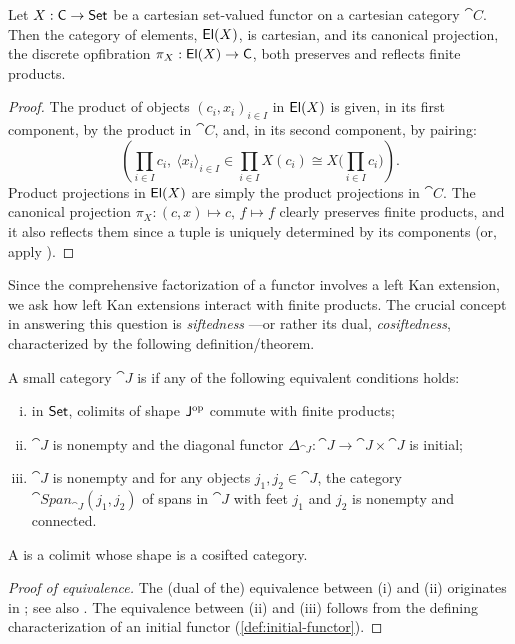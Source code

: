 \documentclass[11pt]{article}
\numberwithin{equation}{section}
\begin{document}
\begin{lemma}
  \label{lem:cartesian-elements-construction}
  Let $X: \mathsf{C} \to \mathsf{Set}$ be a cartesian set-valued functor on a cartesian
  category $\cat{C}$. Then the category of elements, $\mathop{\mathsf{El}}(X)$, is cartesian, and
  its canonical projection, the discrete opfibration ${\pi_X: \mathop{\mathsf{El}}(X) \to \mathsf{C}}$,
  both preserves and reflects finite products.
\end{lemma}
\begin{proof}
  The product of objects $(c_i, x_i)_{i \in I}$ in $\mathop{\mathsf{El}}(X)$ is given, in its
  first component, by the product in $\cat{C}$, and, in its second component, by
  pairing:
  \begin{equation*}
    \left(
      \prod_{i \in I} c_i,\
      \langle x_i \rangle_{i \in I} \in \prod_{i \in I} X(c_i)
        \cong X\big({\textstyle\prod_{i \in I} c_i}\big)
    \right).
  \end{equation*}
  Product projections in $\mathop{\mathsf{El}}(X)$ are simply the product projections in
  $\cat{C}$. The canonical projection $\pi_X: {(c, x) \mapsto c},\, {f \mapsto f}$ clearly
  preserves finite products, and it also reflects them since a tuple is uniquely
  determined by its components (or, apply \cite[\mbox{Lemma
    6.8}]{patterson2023}).
\end{proof}

Since the comprehensive factorization of a functor involves a left Kan
extension, we ask how left Kan extensions interact with finite products. The
crucial concept in answering this question is \emph{siftedness}
\cite{gabriel1971}---or rather its dual, \emph{cosiftedness}, characterized by
the following definition/theorem.

\begin{definition}[Cosiftedness]
  \label{def:cosifted}
  A small category $\cat{J}$ is  if any of the following
  equivalent conditions holds:
  \begin{enumerate}[(i),noitemsep]
    \item in $\mathsf{Set}$, colimits of shape $\mathsf{J}^{\mathrm{op}}$ commute with finite
      products;
    \item $\cat{J}$ is nonempty and the diagonal functor
      $\Delta_{\cat{J}}: \cat{J} \to \cat{J} \times \cat{J}$ is initial;
    \item $\cat{J}$ is nonempty and for any objects $j_1, j_2 \in \cat{J}$, the
      category $\cat{Span}_{\cat{J}}(j_1, j_2)$ of spans in $\cat{J}$ with feet
      $j_1$ and $j_2$ is nonempty and connected.
  \end{enumerate}
  A  is a colimit whose shape is a cosifted category.
\end{definition}
\begin{proof}[Proof of equivalence]
  The (dual of the) equivalence between (i) and (ii) originates in
  \cite{gabriel1971}; see also \cite[\mbox{Theorem 2.15}]{adamek2011}. The
  equivalence between (ii) and (iii) follows from the defining characterization
  of an initial functor (\cref{def:initial-functor}).
\end{proof}
\end{document}
